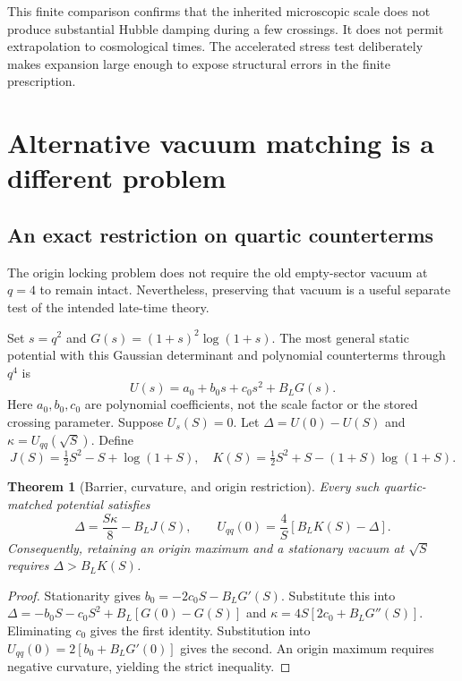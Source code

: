 \documentclass[11pt]{article}
\newtheorem{theorem}{Theorem}[section]\newtheorem{proposition}[theorem]{Proposition}\newtheorem{corollary}[theorem]{Corollary}
\theoremstyle{definition}\newtheorem{definition}[theorem]{Definition}
\begin{document}
This finite comparison confirms that the inherited microscopic scale does not produce substantial Hubble damping during a few crossings. It does not permit extrapolation to cosmological times. The accelerated stress test deliberately makes expansion large enough to expose structural errors in the finite prescription.

\section{Alternative vacuum matching is a different problem}
\subsection{An exact restriction on quartic counterterms}
The origin locking problem does not require the old empty-sector vacuum at $q=4$ to remain intact. Nevertheless, preserving that vacuum is a useful separate test of the intended late-time theory.

Set $s=q^2$ and $G(s)=(1+s)^2\log(1+s)$. The most general static potential with this Gaussian determinant and polynomial counterterms through $q^4$ is
\begin{equation}
U(s)=a_0+b_0s+c_0s^2+B_LG(s).
\end{equation}
Here $a_0,b_0,c_0$ are polynomial coefficients, not the scale factor or the stored crossing parameter. Suppose $U_s(S)=0$. Let
$\Delta=U(0)-U(S)$ and $\kappa=U_{qq}(\sqrt S)$. Define
\begin{equation}
J(S)=\tfrac12S^2-S+\log(1+S),\quad
K(S)=\tfrac12S^2+S-(1+S)\log(1+S).
\end{equation}

\begin{theorem}[Barrier, curvature, and origin restriction]\label{thm:matching}
Every such quartic-matched potential satisfies
\begin{equation}
\boxed{\Delta=\frac{S\kappa}{8}-B_LJ(S),\qquad
U_{qq}(0)=\frac{4}{S}[B_LK(S)-\Delta].}\label{eq:invariants}
\end{equation}
Consequently, retaining an origin maximum and a stationary vacuum at $\sqrt S$ requires $\Delta>B_LK(S)$.
\end{theorem}
\begin{proof}
Stationarity gives $b_0=-2c_0S-B_LG'(S)$. Substitute this into
$\Delta=-b_0S-c_0S^2+B_L[G(0)-G(S)]$ and
$\kappa=4S[2c_0+B_LG''(S)]$. Eliminating $c_0$ gives the first identity. Substitution into $U_{qq}(0)=2[b_0+B_LG'(0)]$ gives the second. An origin maximum requires negative curvature, yielding the strict inequality.
\end{proof}
\end{document}

